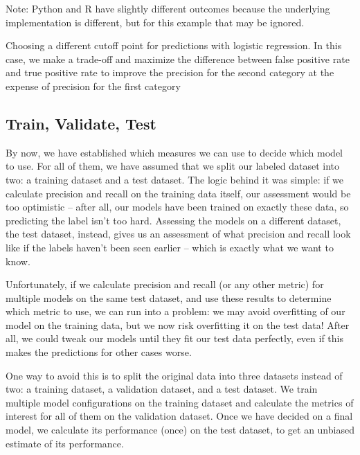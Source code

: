 \begin{ccsexample}
  Note: Python and R have slightly different outcomes because the underlying implementation is different, but for this example that may be ignored.
  \caption{Choosing a different cutoff point for predictions with logistic regression. In this case, we make a trade-off and maximize the difference between false positive rate and true positive rate to improve the precision for the second category at the expense of precision for the first category}
  \label{ex:cutoffpoint}
\end{ccsexample}




\subsection{Train, Validate, Test}\label{sec:train}

By now, we have established which measures we can use to decide which
model to use. For all of them, we have assumed that we split our
labeled dataset into two: a training dataset and a test dataset. The
logic behind it was simple: if we calculate precision and recall
on the training data itself, our assessment would be too optimistic --
after all, our models have been trained on exactly these data, so
predicting the label isn't too hard. Assessing the models on a different
dataset, the test dataset, instead, gives us an assessment of what
precision and recall look like if the labels haven't been seen earlier --
which is exactly what we want to know.

Unfortunately, if we calculate precision and recall (or any other
metric) for multiple models on the same test dataset, and use these
results to determine which metric to use, we can run into a problem:
we may avoid overfitting of our model on the training data, but we now risk
overfitting it on the test data! After all, we could tweak our models until they fit our test data perfectly, even if this makes the
predictions for other cases worse.

One way to avoid this is to split the original data into three
datasets instead of two: a training dataset, a validation dataset, and
a test dataset. We train multiple model configurations on the
training dataset and calculate the metrics of interest for all of them
on the validation dataset. Once we have decided on a final model, we
calculate its performance (once) on the test dataset, to get an
unbiased estimate of its performance.



